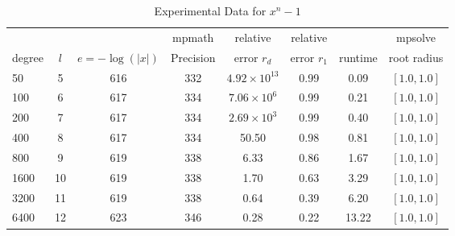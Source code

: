 \documentclass[sigconf]{acmart}
\begin{document}
\begin{table}[t]
\caption{Experimental Data for $x^n - 1$}
\label{tab:nroots}
\vskip -0.15in
\begin{center}
\begin{small}
\begin{sc}
\begin{tabular}{lccccccc}
\toprule
&  &  & mpmath & relative  & relative &  & mpsolve \\
degree  & $l$& $e=-\log(|x|)$& Precision &error $r_d$       & error $r_1$ &runtime& root radius\\
\midrule
    50 & 5 & 616 & 332 & $4.92 \times 10^{13}$  & 0.99 & 0.09 & $[1.0, 1.0]$ \\
  100 & 6 & 617 & 334 & $ 7.06 \times 10^{6}$ & 0.99 & 0.21 & $[1.0, 1.0]$ \\%
  200 & 7 & 617 & 334 & $ 2.69 \times 10^{3}$ & 0.99 & 0.40 & $[1.0, 1.0]$ \\
  400 & 8 & 617 & 334 & 50.50 & 0.98 & 0.81 & $[1.0, 1.0]$ \\
  800 & 9 &  619 & 338 & 6.33 & 0.86 & 1.67 & $[1.0, 1.0]$ \\
1600 &10& 619 & 338 & 1.70 & 0.63 & 3.29 & $[1.0, 1.0]$ \\
3200 &11& 619 & 338 & 0.64 & 0.39 & 6.20 & $[1.0, 1.0]$ \\
6400 &12& 623 & 346 & 0.28 & 0.22 & 13.22 & $[1.0, 1.0]$ \\
\bottomrule
\end{tabular}
\end{sc}
\end{small}
\end{center}
\vskip 0.05in
\end{table}
\end{document}
